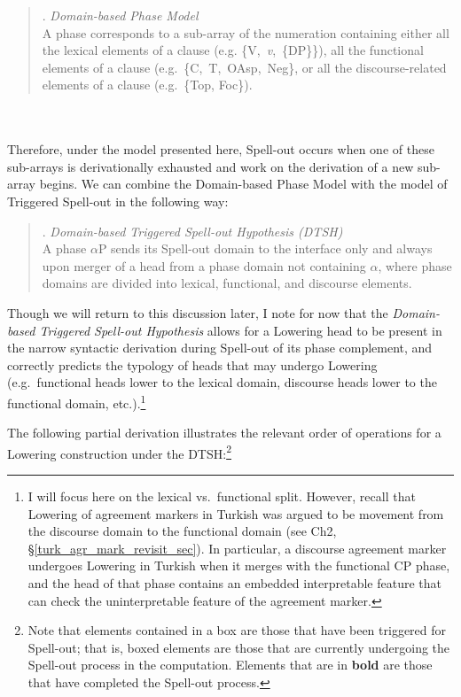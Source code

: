 \singlespacing
\begin{minipage}{5.5in}
\begin{quote}
\ex. {\it Domain-based Phase Model}\\
A phase corresponds to a sub-array of the numeration containing either all the lexical elements of a clause (e.g. \{V,~{\it v},~\{DP\}\}), all the functional elements of a clause (e.g.\ \{C,~T,~OAsp,~Neg\}, or all the discourse-related elements of a clause (e.g.\ \{Top, Foc\}).

\end{quote}
\end{minipage}\\\\
\onehalfspacing
Therefore, under the model presented here, Spell-out occurs when one of these sub-arrays is derivationally exhausted and work on the derivation of a new sub-array begins. We can combine the Domain-based Phase Model with the model of Triggered Spell-out in the following way:

\singlespacing
\begin{quote}
\ex. {\it Domain-based Triggered Spell-out Hypothesis (DTSH)}\\
A phase $\alpha$P sends its Spell-out domain to the interface only and always upon merger of a head from a phase  domain not containing $\alpha$, where phase domains are divided into lexical, functional, and discourse elements.

\end{quote}
\onehalfspacing
Though we will return to this discussion later, I note for now that the {\it Domain-based Triggered Spell-out Hypothesis} allows for a Lowering head to be present in the narrow syntactic derivation during Spell-out of its phase complement, and correctly predicts the typology of heads that may undergo Lowering (e.g.\ functional heads lower to the lexical domain, discourse heads lower to the functional domain, etc.).\footnote{I will focus here on the lexical vs.\ functional split. However, recall that Lowering of agreement markers in Turkish was argued to be movement from the discourse domain to the functional domain (see Ch2, \S\ref{turk_agr_mark_revisit_sec}). In particular, a discourse agreement marker undergoes Lowering in Turkish when it merges with the functional CP phase, and the head of that phase contains an embedded interpretable feature that can check the uninterpretable feature of the agreement marker.} 

The following partial derivation illustrates the relevant order of operations for a Lowering construction under the DTSH:\footnote{Note that elements contained in a box are those that have been triggered for Spell-out; that is, boxed elements are those that are currently undergoing the Spell-out process in the computation. Elements that are in {\bf bold} are those that have completed the Spell-out process.}

